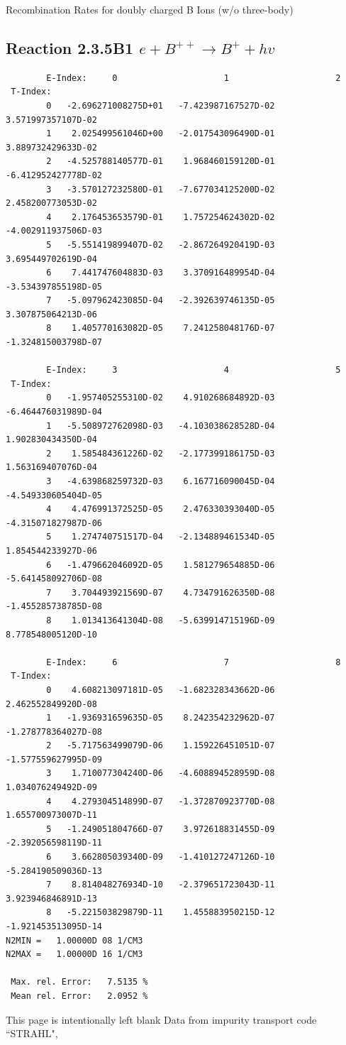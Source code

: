\documentclass[12pt,dvipdfmx]{article}
\begin{document}
  Recombination Rates for doubly charged B Ions (w/o three-body)
\subsection{
Reaction 2.3.5B1  $e + B^{++} \rightarrow B^+ + hv$
}

\begin{small}\begin{verbatim}
        E-Index:     0                     1                     2
 T-Index:
        0   -2.696271008275D+01   -7.423987167527D-02    3.571997357107D-02
        1    2.025499561046D+00   -2.017543096490D-01    3.889732429633D-02
        2   -4.525788140577D-01    1.968460159120D-01   -6.412952427778D-02
        3   -3.570127232580D-01   -7.677034125200D-02    2.458200773053D-02
        4    2.176453653579D-01    1.757254624302D-02   -4.002911937506D-03
        5   -5.551419899407D-02   -2.867264920419D-03    3.695449702619D-04
        6    7.441747604883D-03    3.370916489954D-04   -3.534397855198D-05
        7   -5.097962423085D-04   -2.392639746135D-05    3.307875064213D-06
        8    1.405770163082D-05    7.241258048176D-07   -1.324815003798D-07

        E-Index:     3                     4                     5
 T-Index:
        0   -1.957405255310D-02    4.910268684892D-03   -6.464476031989D-04
        1   -5.508972762098D-03   -4.103038628528D-04    1.902830434350D-04
        2    1.585484361226D-02   -2.177399186175D-03    1.563169407076D-04
        3   -4.639868259732D-03    6.167716090045D-04   -4.549330605404D-05
        4    4.476991372525D-05    2.476330393040D-05   -4.315071827987D-06
        5    1.274740751517D-04   -2.134889461534D-05    1.854544233927D-06
        6   -1.479662046092D-05    1.581279654885D-06   -5.641458092706D-08
        7    3.704493921569D-07    4.734791626350D-08   -1.455285738785D-08
        8    1.013413641304D-08   -5.639914715196D-09    8.778548005120D-10

        E-Index:     6                     7                     8
 T-Index:
        0    4.608213097181D-05   -1.682328343662D-06    2.462552849920D-08
        1   -1.936931659635D-05    8.242354232962D-07   -1.278778364027D-08
        2   -5.717563499079D-06    1.159226451051D-07   -1.577559627995D-09
        3    1.710077304240D-06   -4.608894528959D-08    1.034076249492D-09
        4    4.279304514899D-07   -1.372870923770D-08    1.655700973007D-11
        5   -1.249051804766D-07    3.972618831455D-09   -2.392056598119D-11
        6    3.662805039340D-09   -1.410127247126D-10   -5.284190509036D-13
        7    8.814048276934D-10   -2.379651723043D-11    3.923946846891D-13
        8   -5.221503829879D-11    1.455883950215D-12   -1.921453513095D-14
N2MIN =   1.00000D 08 1/CM3
N2MAX =   1.00000D 16 1/CM3

 Max. rel. Error:   7.5135 %
 Mean rel. Error:   2.0952 %

\end{verbatim}\end{small}
\newpage
This page is intentionally left blank
\newpage
Data from impurity transport code ``STRAHL", \cite{kn:Behringer}
\end{document}

